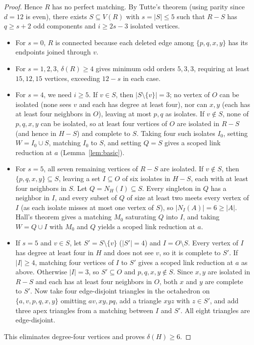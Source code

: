 \documentclass[11pt]{article}
\begin{document}
\begin{proof}
Hence $R$ has no perfect matching. By Tutte's theorem (using parity since $d=12$ is even), there exists $S\subseteq V(R)$ with $s=|S|\leq 5$ such that $R-S$ has $q\geq s+2$ odd components and $i\geq 2s-3$ isolated vertices.
\begin{itemize}
\item For $s=0$, $R$ is connected because each deleted edge among $\{p,q,x,y\}$ has its endpoints joined through $v$.
\item For $s=1,2,3$, $\delta(R)\geq 4$ gives minimum odd orders $5,3,3$, requiring at least $15,12,15$ vertices, exceeding $12-s$ in each case.
\item For $s=4$, we need $i\geq 5$. If $v\in S$, then $|S\setminus\{v\}|=3$; no vertex of $O$ can be isolated (none sees $v$ and each has degree at least four), nor can $x,y$ (each has at least four neighbors in $O$), leaving at most $p,q$ as isolates. If $v\notin S$, none of $p,q,x,y$ can be isolated, so at least four vertices of $O$ are isolated in $R-S$ (and hence in $H-S$) and complete to $S$. Taking four such isolates $I_0$, setting $W=I_0\cup S$, matching $I_0$ to $S$, and setting $Q=S$ gives a scoped link reduction at $a$ (Lemma~\ref{lem:basic}).
\item For $s=5$, all seven remaining vertices of $R-S$ are isolated. If $v\notin S$, then $\{p,q,x,y\}\subseteq S$, leaving a set $I\subseteq O$ of six isolates in $H-S$, each with at least four neighbors in $S$. Let $Q=N_H(I)\subseteq S$. Every singleton in $Q$ has a neighbor in $I$, and every subset of $Q$ of size at least two meets every vertex of $I$ (as each isolate misses at most one vertex of $S$), so $|N_I(A)|=6\geq |A|$. Hall's theorem gives a matching $M_0$ saturating $Q$ into $I$, and taking $W=Q\cup I$ with $M_0$ and $Q$ yields a scoped link reduction at $a$.
\item If $s=5$ and $v\in S$, let $S'=S\setminus\{v\}$ ($|S'|=4$) and $I=O\setminus S$. Every vertex of $I$ has degree at least four in $H$ and does not see $v$, so it is complete to $S'$. If $|I|\geq 4$, matching four vertices of $I$ to $S'$ gives a scoped link reduction at $a$ as above. Otherwise $|I|=3$, so $S'\subseteq O$ and $p,q,x,y\notin S$. Since $x,y$ are isolated in $R-S$ and each has at least four neighbors in $O$, both $x$ and $y$ are complete to $S'$. Now take four edge-disjoint triangles in the octahedron on $\{a,v,p,q,x,y\}$ omitting $av,xy,pq$, add a triangle $xyz$ with $z\in S'$, and add three apex triangles from a matching between $I$ and $S'$. All eight triangles are edge-disjoint.
\end{itemize}
This eliminates degree-four vertices and proves $\delta(H)\geq 6$.


\end{proof}
\end{document}
